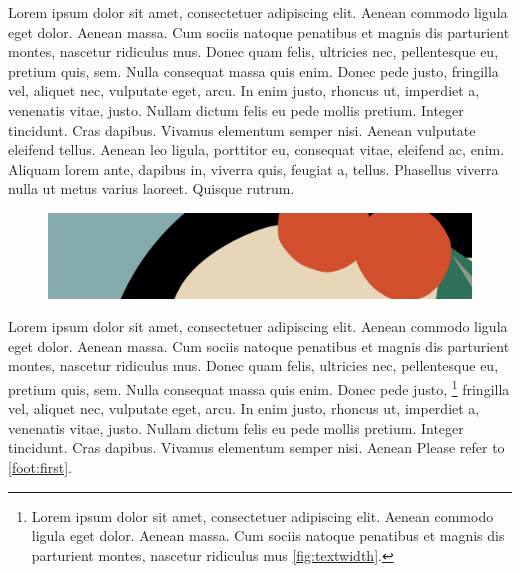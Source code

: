 \documentclass[a4paper]{article}
\begin{document}
Lorem ipsum dolor sit amet, consectetuer adipiscing elit. Aenean commodo ligula
eget dolor. Aenean massa. Cum sociis natoque penatibus et magnis dis parturient
montes, nascetur ridiculus mus. Donec quam felis, ultricies nec, pellentesque
eu, pretium quis, sem. Nulla consequat massa quis enim. Donec pede justo,
fringilla vel, aliquet nec, vulputate eget, arcu. In enim justo, rhoncus ut,
imperdiet a, venenatis vitae, justo. Nullam dictum felis eu pede mollis
pretium. Integer tincidunt. Cras dapibus. Vivamus elementum semper nisi. Aenean
vulputate eleifend tellus. Aenean leo ligula, porttitor eu, consequat vitae,
eleifend ac, enim. Aliquam lorem ante, dapibus in, viverra quis, feugiat a,
tellus. Phasellus viverra nulla ut metus varius laoreet. Quisque rutrum.

\begin{figure}[h]
	\includegraphics[width=\linewidth]{test-2.png}
\end{figure}

Lorem ipsum dolor sit amet, consectetuer adipiscing elit. Aenean commodo ligula
eget dolor. Aenean massa. Cum sociis natoque penatibus et magnis dis parturient
montes, nascetur ridiculus mus. Donec quam felis, ultricies nec, pellentesque
eu, pretium quis, sem. Nulla consequat massa quis enim. Donec pede justo,
\footnote{\label{foot:second}%
	Lorem ipsum dolor sit amet, consectetuer adipiscing elit. Aenean commodo ligula
	eget dolor. Aenean massa. Cum sociis natoque penatibus et magnis dis parturient
	montes, nascetur ridiculus mus
	\autoref{fig:textwidth}.
}
fringilla vel, aliquet nec, vulputate eget, arcu. In enim justo, rhoncus ut,
imperdiet a, venenatis vitae, justo. Nullam dictum felis eu pede mollis
pretium. Integer tincidunt. Cras dapibus. Vivamus elementum semper nisi. Aenean
Please refer to \autoref{foot:first}.
\end{document}
